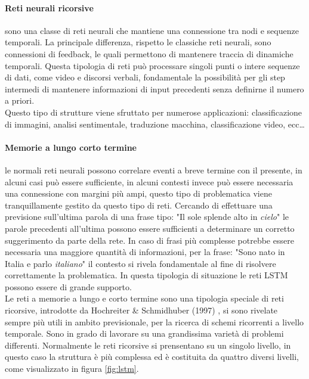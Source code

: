 \documentclass[%
    corpo=12pt,
    twoside,
    oldstyle,
    autoretitolo,
    greek,
    evenboxes,
]{toptesi}
\begin{document}
\paragraph{Reti neurali ricorsive} sono una classe di reti neurali che mantiene una connessione tra nodi e sequenze temporali. La principale differenza, rispetto le classiche reti neurali, sono connessioni di feedback, le quali permettono di mantenere traccia di dinamiche temporali. Questa tipologia di reti può processare singoli punti o intere sequenze di dati, come video e discorsi verbali, fondamentale la possibilità per gli step intermedi di mantenere informazioni di input precedenti senza definirne il numero a priori.\\
Questo tipo di strutture viene sfruttato per numerose applicazioni: classificazione di immagini, analisi sentimentale, traduzione macchina, classificazione video, ecc\dots

\paragraph{Memorie a lungo corto termine} le normali reti neurali possono correlare eventi a breve termine con il presente, in alcuni casi può essere sufficiente, in alcuni contesti invece può essere necessaria una connessione con margini più ampi, questo tipo di problematica viene tranquillamente gestito da questo tipo di reti. Cercando di effettuare una previsione sull'ultima parola di una frase tipo: "Il sole splende alto in \textit{cielo}" le parole precedenti all'ultima possono essere sufficienti a determinare un corretto suggerimento da parte della rete. In caso di frasi più complesse potrebbe essere necessaria una maggiore quantità di informazioni, per la frase: "Sono nato in Italia e parlo \textit{italiano}" il contesto si rivela fondamentale al fine di risolvere correttamente la problematica. In questa tipologia di situazione le reti LSTM possono essere di grande supporto.\\
Le reti a memorie a lungo e corto termine sono una tipologia speciale di reti ricorsive, introdotte da Hochreiter \& Schmidhuber (1997) \cite{lstm}, si sono rivelate sempre più utili in ambito previsionale, per la ricerca di schemi ricorrenti a livello temporale. Sono in grado di lavorare su una grandissima varietà di problemi differenti. Normalmente le reti ricorsive si prensentano su un singolo livello, in questo caso la struttura è più complessa ed è costituita da quattro diversi livelli, come visualizzato in figura \ref{fig:lstm}.
\end{document}
